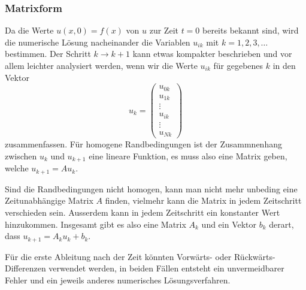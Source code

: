 \subsubsection{Matrixform}
Da die Werte $u(x,0)=f(x)$ von $u$ zur Zeit $t=0$ bereits bekannt
sind, wird die numerische Lösung nacheinander die Variablen
$u_{ik}$ mit $k=1,2,3,\dots$ bestimmen.
Der Schritt $k\to k+1$ kann etwas kompakter beschrieben und vor allem
leichter analysiert werden, wenn wir die Werte $u_{ik}$ für gegebenes $k$
in den Vektor
\[
u_k = \begin{pmatrix}
u_{0k}\\
u_{1k}\\
\vdots\\
u_{ik}\\
\vdots\\
u_{Nk}
\end{pmatrix}
\]
zusammenfassen.
Für homogene Randbedingungen ist der Zusammnenhang zwischen $u_k$
und $u_{k+1}$ eine lineare Funktion, es muss also eine Matrix geben,
welche $u_{k+1}=Au_k$.

Sind die Randbedingungen nicht homogen, kann man nicht mehr unbeding
eine Zeitunabhängige Matrix $A$ finden, vielmehr kann die Matrix
in jedem Zeitschritt verschieden sein.
Ausserdem kann in jedem Zeitschritt ein konstanter Wert hinzukommen.
Insgesamt gibt es also eine Matrix $A_k$ und ein Vektor $b_k$ derart,
dass $u_{k+1} = A_ku_k + b_k$.


Für die erste Ableitung nach der Zeit könnten Vorwärts- oder
Rückwärts-Differenzen verwendet werden, in beiden Fällen entsteht
ein unvermeidbarer Fehler und ein jeweils anderes numerisches
Lösungsverfahren.

